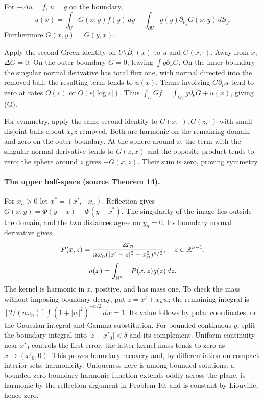 \begin{theorem}
For $-\Delta u=f$, $u=g$ on the boundary,
\[
 u(x)=\int_U G(x,y)f(y)\,dy
       -\int_{\partial U}g(y)\partial_{\nu_y}G(x,y)\,dS_y.
 \tag{G}
\]
Furthermore $G(x,y)=G(y,x)$.
\end{theorem}
\begin{expandedproof}
Apply the second Green identity on $U\setminus\overline B_\varepsilon(x)$
to $u$ and $G(x,\cdot)$. Away from $x$, $\Delta G=0$.
On the outer boundary $G=0$, leaving $\int g\partial_\nu G$.
On the inner boundary the singular normal derivative has total flux
one, with normal directed into the removed ball; the resulting term
tends to $u(x)$. Terms involving $G\partial_\nu u$ tend to zero at
rates $O(\varepsilon)$ or $O(\varepsilon|\log\varepsilon|)$.
Thus $\int_U Gf=\int_{\partial U}g\partial_\nu G+u(x)$, giving (G).

For symmetry, apply the same second identity to
$G(x,\cdot),G(z,\cdot)$ with small disjoint balls about $x,z$ removed.
Both are harmonic on the remaining domain and zero on the outer
boundary. At the sphere around $x$, the term with the singular normal
derivative tends to $G(z,x)$ and the opposite product tends to zero;
the sphere around $z$ gives $-G(x,z)$.
Their sum is zero, proving symmetry.
\end{expandedproof}

\paragraph{The upper half-space (source Theorem 14).}
For $x_n>0$ let $x^*=(x',-x_n)$.
Reflection gives $G(x,y)=\Phi(y-x)-\Phi(y-x^*)$.
The singularity of the image lies outside the domain, and the two
distances agree on $y_n=0$.
Its boundary normal derivative gives
\[
 P(x,z)=\frac{2x_n}{n\omega_n(|x'-z|^2+x_n^2)^{n/2}},
 \quad z\in\mathbb{R}^{n-1}.
\]
\[
 u(x)=\int_{\mathbb{R}^{n-1}}P(x,z)g(z)\,dz.
\]
The kernel is harmonic in $x$, positive, and has mass one.
To check the mass without imposing boundary decay, put $z=x'+x_n w$;
the remaining integral is
$[2/(n\omega_n)]\int(1+|w|^2)^{-n/2}\,dw=1$.
Its value follows by polar coordinates, or the Gaussian integral and
Gamma substitution.
For bounded continuous $g$, split the boundary integral into
$|z-x'_0|<\delta$ and its complement.
Uniform continuity near $x'_0$ controls the first error; the latter
kernel mass tends to zero as $x\to(x'_0,0)$.
This proves boundary recovery and, by differentiation on compact interior
sets, harmonicity.
Uniqueness here is among bounded solutions: a bounded zero-boundary
harmonic function extends oddly across the plane, is harmonic by the
reflection argument in Problem 10, and is constant by Liouville, hence zero.


